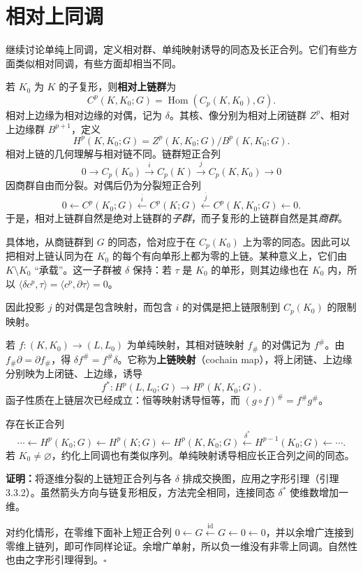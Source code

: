 \section{相对上同调}
继续讨论单纯上同调，定义相对群、单纯映射诱导的同态及长正合列。它们有些方面类似相对同调，有些方面却相当不同。

若 $K_0$ 为 $K$ 的子复形，则\textbf{相对上链群}为
\[
C^p(K,K_0;G)=\operatorname{Hom}(C_p(K,K_0),G).
\]
相对上边缘为相对边缘的对偶，记为 $\delta$。其核、像分别为相对上闭链群 $Z^p$、相对上边缘群 $B^{p+1}$，定义
\[
H^p(K,K_0;G)=Z^p(K,K_0;G)/B^p(K,K_0;G).
\]
相对上链的几何理解与相对链不同。链群短正合列
\[
0\to C_p(K_0)\xrightarrow{i}C_p(K)\xrightarrow{j}C_p(K,K_0)\to0
\]
因商群自由而分裂。对偶后仍为分裂短正合列
\[
0\leftarrow C^p(K_0;G)\xleftarrow{\overline i}C^p(K;G)
\xleftarrow{\overline j}C^p(K,K_0;G)\leftarrow0.
\]
于是，相对上链群自然是绝对上链群的\emph{子群}，而子复形的上链群自然是其\emph{商群}。

具体地，从商链群到 $G$ 的同态，恰对应于在 $C_p(K_0)$ 上为零的同态。因此可以把相对上链认同为在 $K_0$ 的每个有向单形上都为零的上链。某种意义上，它们由 $K\setminus K_0$ “承载”。这一子群被 $\delta$ 保持：若 $\tau$ 是 $K_0$ 的单形，则其边缘也在 $K_0$ 内，所以 $\langle\delta c^p,\tau\rangle=\langle c^p,\partial\tau\rangle=0$。

因此投影 $j$ 的对偶是包含映射，而包含 $i$ 的对偶是把上链限制到 $C_p(K_0)$ 的限制映射。

若 $f:(K,K_0)\to(L,L_0)$ 为单纯映射，其相对链映射 $f_\#$ 的对偶记为 $f^\#$。由 $f_\#\partial=\partial f_\#$，得 $\delta f^\#=f^\#\delta$。它称为\textbf{上链映射}（cochain map），将上闭链、上边缘分别映为上闭链、上边缘，诱导
\[
f^*:H^p(L,L_0;G)\to H^p(K,K_0;G).
\]
函子性质在上链层次已经成立：恒等映射诱导恒等，而 $(g\circ f)^\#=f^\#g^\#$。

存在长正合列
\[
\cdots\leftarrow H^p(K_0;G)\leftarrow H^p(K;G)\leftarrow H^p(K,K_0;G)
\xleftarrow{\delta^*}H^{p-1}(K_0;G)\leftarrow\cdots.
\]
若 $K_0\ne\varnothing$，约化上同调也有类似序列。单纯映射诱导相应长正合列之间的同态。

\textbf{证明：}将逐维分裂的上链短正合列与各 $\delta$ 排成交换图，应用之字形引理（引理 3.3.2）。虽然箭头方向与链复形相反，方法完全相同，连接同态 $\delta^*$ 使维数增加一维。

对约化情形，在零维下面补上短正合列 $0\leftarrow G\xleftarrow{\operatorname{id}}G\leftarrow0\leftarrow0$，并以余增广连接到零维上链列，即可作同样论证。余增广单射，所以负一维没有非零上同调。自然性也由之字形引理得到。\hfill$\square$

